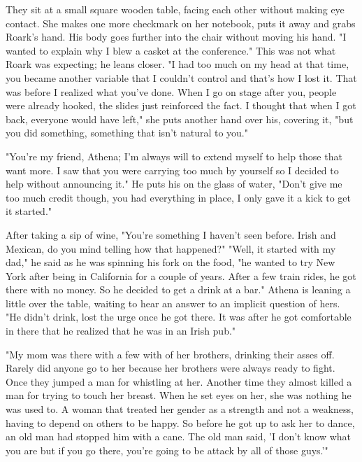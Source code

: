         They sit at a small square wooden table, facing each other without making eye contact. She makes one more checkmark on her notebook, puts
    it away and grabs Roark's hand. His body goes further into the chair without moving his hand. "I wanted to explain why I blew a casket at the
    conference." This was not what Roark was expecting; he leans closer. "I had too much on my head at that time, you became another variable
    that I couldn't control and that's how I lost it. That was before I realized what you've done. When I go on stage after you, people were
    already hooked, the slides just reinforced the fact. I thought that when I got back, everyone would have left," she puts another hand over
    his, covering it, "but you did something, something that isn't natural to you."

        "You're my friend, Athena; I'm always will to extend myself to help those that want more. I saw that you were carrying too much by 
    yourself so I decided to help without announcing it." He puts his on the glass of water, "Don't give me too much credit though, you had
    everything in place, I only gave it a kick to get it started."

        After taking a sip of wine, "You're something I haven't seen before. Irish and Mexican, do you mind telling how that happened?" "Well,
    it started with my dad," he said as he was spinning his fork on the food, "he wanted to try New York after being in California for a 
    couple of years. After a few train rides, he got there with no money. So he decided to get a drink at a bar." Athena is leaning a little
    over the table, waiting to hear an answer to an implicit question of hers. "He didn't drink, lost the urge once he got there. It was after
    he got comfortable in there that he realized that he was in an Irish pub."

        "My mom was there with a few with of her brothers, drinking their asses off. Rarely did anyone go to her because her brothers were
    always ready to fight. Once they jumped a man for whistling at her. Another time they almost killed a man for trying to touch her breast.
    When he set eyes on her, she was nothing he was used to. A woman that treated her gender as a strength and not a weakness, having to depend
    on others to be happy. So before he got up to ask her to dance, an old man had stopped him with a cane. The old man said, 'I don't know
    what you are but if you go there, you're going to be attack by all of those guys.'"

